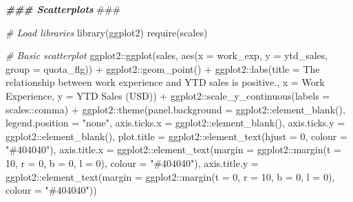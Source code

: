 \documentclass[
]{book}
\newenvironment{Shaded}{\begin{snugshade}}{\end{snugshade}}
\newcommand{\AlertTok}[1]{\textcolor[rgb]{0.94,0.16,0.16}{#1}}
\newcommand{\AttributeTok}[1]{\textcolor[rgb]{0.77,0.63,0.00}{#1}}
\newcommand{\CommentTok}[1]{\textcolor[rgb]{0.56,0.35,0.01}{\textit{#1}}}
\newcommand{\DecValTok}[1]{\textcolor[rgb]{0.00,0.00,0.81}{#1}}
\newcommand{\DocumentationTok}[1]{\textcolor[rgb]{0.56,0.35,0.01}{\textbf{\textit{#1}}}}
\newcommand{\FunctionTok}[1]{\textcolor[rgb]{0.00,0.00,0.00}{#1}}
\newcommand{\NormalTok}[1]{#1}
\newcommand{\SpecialCharTok}[1]{\textcolor[rgb]{0.00,0.00,0.00}{#1}}
\newcommand{\StringTok}[1]{\textcolor[rgb]{0.31,0.60,0.02}{#1}}
\begin{document}
\begin{Shaded}
\begin{Highlighting}[]
\DocumentationTok{\#\#\# Scatterplots }\AlertTok{\#\#\#}

\CommentTok{\# Load libraries}
\FunctionTok{library}\NormalTok{(ggplot2)}
\FunctionTok{require}\NormalTok{(scales)}

\CommentTok{\# Basic scatterplot}
\NormalTok{ggplot2}\SpecialCharTok{::}\FunctionTok{ggplot}\NormalTok{(sales, }\FunctionTok{aes}\NormalTok{(}\AttributeTok{x =}\NormalTok{ work\_exp, }\AttributeTok{y =}\NormalTok{ ytd\_sales, }\AttributeTok{group =}\NormalTok{ quota\_flg)) }\SpecialCharTok{+}
\NormalTok{ggplot2}\SpecialCharTok{::}\FunctionTok{geom\_point}\NormalTok{() }\SpecialCharTok{+}
\NormalTok{ggplot2}\SpecialCharTok{::}\FunctionTok{labs}\NormalTok{(}\AttributeTok{title =} \StringTok{\textquotesingle{}The relationship between work experience and YTD sales is positive.\textquotesingle{}}\NormalTok{, }\AttributeTok{x =} \StringTok{\textquotesingle{}Work Experience\textquotesingle{}}\NormalTok{, }\AttributeTok{y =} \StringTok{\textquotesingle{}YTD Sales (USD)\textquotesingle{}}\NormalTok{) }\SpecialCharTok{+}
\NormalTok{ggplot2}\SpecialCharTok{::}\FunctionTok{scale\_y\_continuous}\NormalTok{(}\AttributeTok{labels =}\NormalTok{ scales}\SpecialCharTok{::}\NormalTok{comma) }\SpecialCharTok{+}
\NormalTok{ggplot2}\SpecialCharTok{::}\FunctionTok{theme}\NormalTok{(}\AttributeTok{panel.background =}\NormalTok{ ggplot2}\SpecialCharTok{::}\FunctionTok{element\_blank}\NormalTok{(),}
               \AttributeTok{legend.position =} \StringTok{"none"}\NormalTok{,}
               \AttributeTok{axis.ticks.x =}\NormalTok{ ggplot2}\SpecialCharTok{::}\FunctionTok{element\_blank}\NormalTok{(),}
               \AttributeTok{axis.ticks.y =}\NormalTok{ ggplot2}\SpecialCharTok{::}\FunctionTok{element\_blank}\NormalTok{(),}
               \AttributeTok{plot.title =}\NormalTok{ ggplot2}\SpecialCharTok{::}\FunctionTok{element\_text}\NormalTok{(}\AttributeTok{hjust =} \DecValTok{0}\NormalTok{, }\AttributeTok{colour =} \StringTok{"\#404040"}\NormalTok{),}
               \AttributeTok{axis.title.x =}\NormalTok{ ggplot2}\SpecialCharTok{::}\FunctionTok{element\_text}\NormalTok{(}\AttributeTok{margin =}\NormalTok{ ggplot2}\SpecialCharTok{::}\FunctionTok{margin}\NormalTok{(}\AttributeTok{t =} \DecValTok{10}\NormalTok{, }\AttributeTok{r =} \DecValTok{0}\NormalTok{, }\AttributeTok{b =} \DecValTok{0}\NormalTok{, }\AttributeTok{l =} \DecValTok{0}\NormalTok{), }\AttributeTok{colour =} \StringTok{"\#404040"}\NormalTok{),}
               \AttributeTok{axis.title.y =}\NormalTok{ ggplot2}\SpecialCharTok{::}\FunctionTok{element\_text}\NormalTok{(}\AttributeTok{margin =}\NormalTok{ ggplot2}\SpecialCharTok{::}\FunctionTok{margin}\NormalTok{(}\AttributeTok{t =} \DecValTok{0}\NormalTok{, }\AttributeTok{r =} \DecValTok{10}\NormalTok{, }\AttributeTok{b =} \DecValTok{0}\NormalTok{, }\AttributeTok{l =} \DecValTok{0}\NormalTok{), }\AttributeTok{colour =} \StringTok{"\#404040"}\NormalTok{))}


\end{Highlighting}
\end{Shaded}
\end{document}
